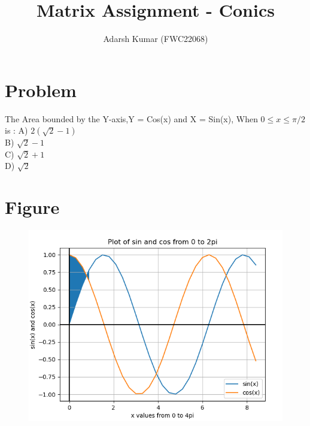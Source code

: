\documentclass[journal,12pt,twocolumn]{IEEEtran}
\title{\mytitle}
\title{
Matrix Assignment - Conics
}
\author{Adarsh Kumar (FWC22068)}
\begin{document}
\maketitle
\tableofcontents
\bigskip


\section{\textbf{Problem}}
The Area bounded by the Y-axis,Y = Cos(x) and X = Sin(x),
When $0 \le x \le \pi/2$ is :
\linebreak
A) $2(\sqrt{2}-1)$ \\ B) $\sqrt{2}-1$\\ C) $\sqrt{2}+1$ \\D) $\sqrt{2}$
\\
\section{\textbf{Figure}}
\begin{figure}[h]
    \centering
\includegraphics[width=\columnwidth]{conic.png}
    \label{fig:my_label}
\end{figure}
\end{document}

